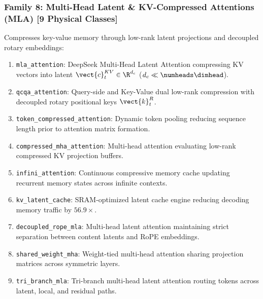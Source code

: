 \subsubsection{Family 8: Multi-Head Latent \& KV-Compressed Attentions (MLA) [9 Physical Classes]}
Compresses key-value memory through low-rank latent projections and decoupled rotary embeddings:
\begin{enumerate}
    \item \texttt{mla\_attention}: DeepSeek Multi-Head Latent Attention compressing KV vectors into latent $\vect{c}_t^{KV} \in \R^{d_c}$ ($d_c \ll \numheads \dimhead$).
    \item \texttt{qcqa\_attention}: Query-side and Key-Value dual low-rank compression with decoupled rotary positional keys $\vect{k}_t^{R}$.
    \item \texttt{token\_compressed\_attention}: Dynamic token pooling reducing sequence length prior to attention matrix formation.
    \item \texttt{compressed\_mha\_attention}: Multi-head attention evaluating low-rank compressed KV projection buffers.
    \item \texttt{infini\_attention}: Continuous compressive memory cache updating recurrent memory states across infinite contexts.
    \item \texttt{kv\_latent\_cache}: SRAM-optimized latent cache engine reducing decoding memory traffic by $56.9\times$.
    \item \texttt{decoupled\_rope\_mla}: Multi-head latent attention maintaining strict separation between content latents and RoPE embeddings.
    \item \texttt{shared\_weight\_mha}: Weight-tied multi-head attention sharing projection matrices across symmetric layers.
    \item \texttt{tri\_branch\_mla}: Tri-branch multi-head latent attention routing tokens across latent, local, and residual paths.
\end{enumerate}

